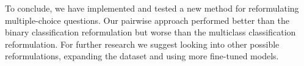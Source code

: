 To conclude, we have implemented and tested a new method for reformulating multiple-choice questions.
Our pairwise approach performed better than the binary classification reformulation but worse than the multiclass classification reformulation.
For further research we suggest looking into other possible reformulations, expanding the dataset and using more fine-tuned models.